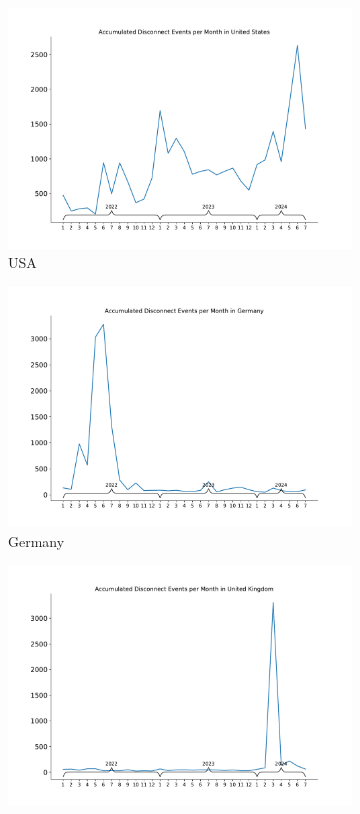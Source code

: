 \begin{figure}
	\centering
	\begin{subfigure}[b]{0.48\linewidth}
		\includegraphics[width=\linewidth]{./chapters/4-results/disconnect_events/US.pdf}
		\caption{USA}
	\end{subfigure}
	\begin{subfigure}[b]{0.48\linewidth}
		\includegraphics[width=\linewidth]{./chapters/4-results/disconnect_events/DE.pdf}
		\caption{Germany}
	\end{subfigure}
	\begin{subfigure}[b]{0.48\linewidth}
		\includegraphics[width=\linewidth]{./chapters/4-results/disconnect_events/GB.pdf}

\end{subfigure}
\end{figure}
